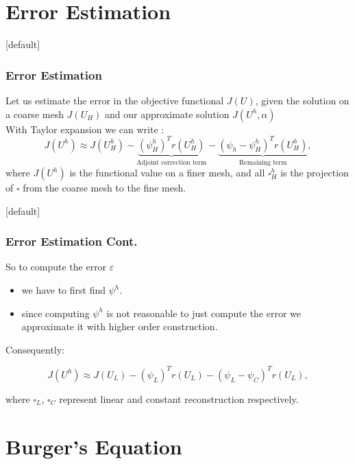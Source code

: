 \documentclass{beamer}
\makeatletter
\newenvironment{withoutheadline}{
        \setbeamertemplate{headline}[default]
        \def\beamer@entrycode{\vspace*{-\headheight}}
    }{}
\makeatother
\begin{document}
\section{Error Estimation}
\begin{withoutheadline}
\begin{frame}\frametitle{Error Estimation} 
Let us estimate the error in  the objective functional $ J(U) $, given the solution on  a coarse mesh $ J(U_H) $ and our approximate solution $J(U^h,\alpha)$\\
With Taylor expansion we can write
:
\begin{displaymath}
J(U^h) \approx  J(U_H^h) - \underbrace{(\psi_H^h)^T r(U_H^h)}_\text{Adjoint correction term} - 
\underbrace{(\psi_h - \psi_H^h)^T r(U_H^h)}_\text{Remaining term},
\end{displaymath}
where $ J(U^h) $ is the functional value on a finer mesh, and all $\square_H^h$ is the projection of $\square$ from the coarse mesh to the fine mesh.
\end{frame}
\end{withoutheadline}
\begin{withoutheadline}
\begin{frame}\frametitle{Error Estimation Cont.} 
So to compute the error $ \varepsilon $%
\begin{itemize}
\item we have to first find $\psi^h$.
\item since computing $\psi^h$ is not reasonable to just compute the error we approximate it with higher order construction.
\end{itemize}
Consequently:

\begin{displaymath}
J(U^h) \approx  J(U_L) - (\psi_L)^T r(U_L) - (\psi_L - \psi_C)^T r(U_L),
\end{displaymath}

where $\square_L$, $\square_C$ represent linear and constant reconstruction respectively.

\end{frame}
\end{withoutheadline}
\section{Burger's Equation}
\end{document}
